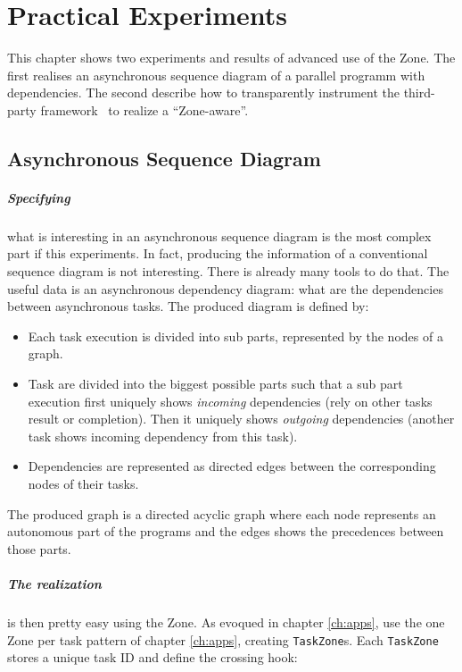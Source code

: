 
\chapter{Practical Experiments}
\label{ch:inpractice}

This chapter shows two experiments and results of advanced use of the Zone. The first realises an asynchronous sequence diagram of a parallel programm with dependencies. The second describe how to transparently instrument the third-party framework \vertx\ to realize a ``Zone-aware\vertx''.

\section{Asynchronous Sequence Diagram}


\paragraph{Specifying} what is interesting in an asynchronous sequence diagram is the most complex part if this experiments. In fact, producing the information of a conventional sequence diagram is not interesting. There is already many tools to do that. The useful data is an asynchronous dependency diagram: what are the dependencies between asynchronous tasks. The produced diagram is defined by:

\begin{itemize}
\item Each task execution is divided into sub parts, represented by the nodes of a graph.
\item Task are divided into the biggest possible parts such that a sub part execution first uniquely shows \emph{incoming} dependencies (rely on other tasks result or completion). Then it uniquely shows \emph{outgoing} dependencies (another task shows incoming dependency from this task).
\item Dependencies are represented as directed edges between the corresponding nodes of their tasks.
\end{itemize}

The produced graph is a directed acyclic graph where each node represents an autonomous part of the programs and the edges shows the precedences between those parts.

\paragraph{The realization} is then pretty easy using the Zone. As evoqued in chapter \ref{ch:apps}, use the one Zone per task pattern of chapter \ref{ch:apps}, creating \lstinline{TaskZone}s. Each \lstinline{TaskZone} stores a unique task ID and define the crossing hook: 

